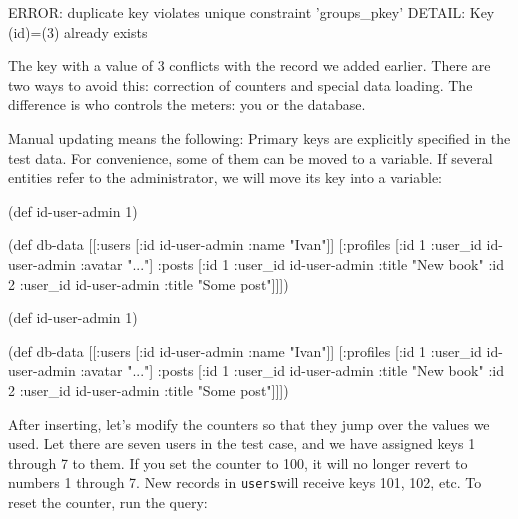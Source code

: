 \begin{english}
  \begin{text}
ERROR: duplicate key violates unique constraint 'groups_pkey'
DETAIL: Key (id)=(3) already exists
  \end{text}
\end{english}

\fi

The key with a value of 3 conflicts with the record we added earlier. There are two ways to avoid this: correction of counters and special data loading. The difference is who controls the meters: you or the database.

Manual updating means the following: Primary keys are explicitly specified in the test data. For convenience, some of them can be moved to a variable. If several entities refer to the administrator, we will move its key
into a variable:

\ifx\DEVICETYPE\MOBILE

\begin{english}
  \begin{clojure}
(def id-user-admin 1)

(def db-data
  [[:users [{:id id-user-admin
             :name "Ivan"}]]
   [:profiles [{:id 1
                :user_id id-user-admin
                :avatar "..."}]
    :posts [{:id 1
             :user_id id-user-admin
             :title "New book"}
            {:id 2
             :user_id id-user-admin
             :title "Some post"}]]])
  \end{clojure}
\end{english}

\else

\begin{english}
  \begin{clojure}
(def id-user-admin 1)

(def db-data
  [[:users [{:id id-user-admin :name "Ivan"}]]
   [:profiles [{:id 1 :user_id id-user-admin :avatar "..."}]
    :posts [{:id 1 :user_id id-user-admin :title "New book"}
            {:id 2 :user_id id-user-admin :title "Some post"}]]])
  \end{clojure}
\end{english}

\fi


After inserting, let's modify the counters so that they jump over the values we used. Let there are seven users in the test case, and we have assigned keys 1 through 7 to them. If you set the counter to 100, it will no longer revert to numbers 1 through 7. New records in \verb|users|will receive keys 101, 102, etc. To reset the counter,
run the query:

